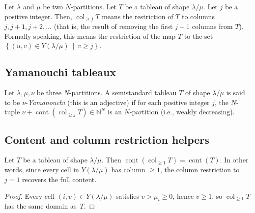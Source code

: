 \begin{definition}
\label{def.sf.col-tab}
\leantarget
\leanok
Let $\lambda$ and $\mu$ be two $N$-partitions. Let $T$
be a tableau of shape $\lambda/\mu$. Let $j$ be a positive integer. Then,
$\operatorname{col}_{\geq j}T$ means the restriction of $T$ to columns
$j,j+1,j+2,\ldots$ (that is, the result of removing the first $j-1$ columns
from $T$). Formally speaking, this means the restriction of the map $T$ to the
set $\left\{  \left(  u,v\right)  \in Y\left(  \lambda/\mu\right)
\ \mid\ v\geq j\right\}  $.
\end{definition}

\subsection{Yamanouchi tableaux}

\begin{definition}
\label{def.sf.yamanouchi}
\leantarget
\leanok
Let $\lambda,\mu,\nu$ be three $N$-partitions. A
semistandard tableau $T$ of shape $\lambda/\mu$ is said to be $\nu
$-\emph{Yamanouchi} (this is an adjective) if for each positive integer $j$,
the $N$-tuple $\nu+\operatorname*{cont}\left(  \operatorname{col}_{\geq
j}T\right)  \in\mathbb{N}^{N}$ is an $N$-partition (i.e., weakly decreasing).
\end{definition}

\subsection{Content and column restriction helpers}

\begin{lemma}
\label{lem.sf.content-col-geq-one}
\leanhelper
\leanok
Let $T$ be a tableau of shape $\lambda/\mu$. Then
$\operatorname{cont}(\operatorname{col}_{\geq 1} T) = \operatorname{cont}(T)$.
In other words, since every cell in $Y(\lambda/\mu)$ has column $\geq 1$,
the column restriction to $j = 1$ recovers the full content.
\end{lemma}

\begin{proof}
\leanok
Every cell $(i, v) \in Y(\lambda/\mu)$ satisfies $v > \mu_i \geq 0$,
hence $v \geq 1$, so $\operatorname{col}_{\geq 1} T$ has the same domain as~$T$.
\end{proof}

